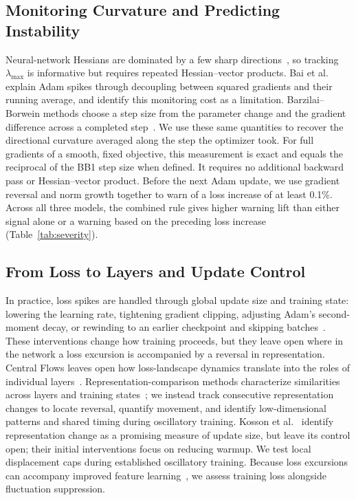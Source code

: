 \subsection{Monitoring Curvature and Predicting Instability}

Neural-network Hessians are dominated by a few sharp directions~\cite{sagun2017hessian,ghorbani2019density}, so tracking $\lambda_{\max}$ is informative but requires repeated Hessian--vector products. Bai et al.~\cite{bai2026spikes} explain Adam spikes through decoupling between squared gradients and their running average, and identify this monitoring cost as a limitation. Barzilai--Borwein methods choose a step size from the parameter change and the gradient difference across a completed step~\cite{barzilai1988two,tan2016bbsgd}. We use these same quantities to recover the directional curvature averaged along the step the optimizer took. For full gradients of a smooth, fixed objective, this measurement is exact and equals the reciprocal of the BB1 step size when defined. It requires no additional backward pass or Hessian--vector product. Before the next Adam update, we use gradient reversal and norm growth together to warn of a loss increase of at least 0.1\%. Across all three models, the combined rule gives higher warning lift than either signal alone or a warning based on the preceding loss increase (Table~\ref{tab:severity}).

\subsection{From Loss to Layers and Update Control}

In practice, loss spikes are handled through global update size and training state: lowering the learning rate, tightening gradient clipping, adjusting Adam's second-moment decay, or rewinding to an earlier checkpoint and skipping batches~\cite{chowdhery2022palm,zhang2022opt,bai2026spikes}. These interventions change how training proceeds, but they leave open where in the network a loss excursion is accompanied by a reversal in representation. Central Flows leaves open how loss-landscape dynamics translate into the roles of individual layers~\cite{cohen2025central}. Representation-comparison methods characterize similarities across layers and training states~\cite{raghu2017svcca,kornblith2019similarity}; we instead track consecutive representation changes to locate reversal, quantify movement, and identify low-dimensional patterns and shared timing during oscillatory training. Kosson et al.~\cite{kosson2024warmup} identify representation change as a promising measure of update size, but leave its control open; their initial interventions focus on reducing warmup. We test local displacement caps during established oscillatory training. Because loss excursions can accompany improved feature learning~\cite{zhu2024catapults}, we assess training loss alongside fluctuation suppression.
